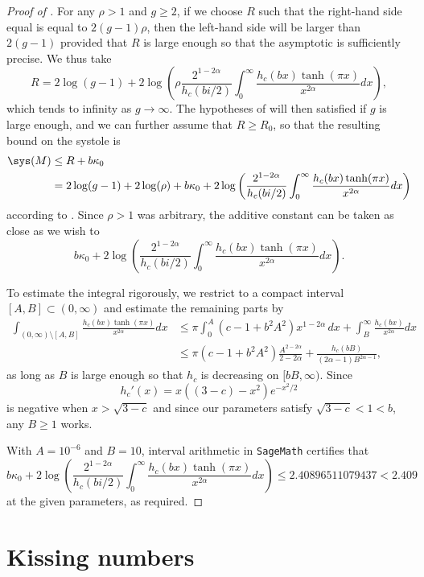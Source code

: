 \documentclass[12pt]{amsart}
\numberwithin{equation}{section}
\begin{document}
\begin{proof}[Proof of ]
For any $\rho>1$ and $g\geq 2$, if we choose $R$ such that the right-hand side equal is equal to $2(g-1)\rho$, then the left-hand side will be larger than $2(g-1)$ provided that $R$ is large enough so that the asymptotic is sufficiently precise. We thus take
\[
R = 2 \log(g-1)+2\log\left( \rho \frac{2 ^{1-2\alpha}}{h_c(bi/2)} \int_0^\infty \frac{h_c(bx) \tanh(\pi x)}{x^{2\alpha}}dx  \right)   ,
\]
which tends to infinity as $g \to \infty$. The hypotheses of  will then  satisfied if $g$ is large enough, and we can further assume that $R \geq R_0$, so that the resulting bound on the systole is
\begin{align*}
\sys(M) &\leq R + b \kappa_0 \\
& = 2 \log(g-1) + 2\log(\rho) +b \kappa_0 + 2 \log \left( \frac{2 ^{1-2\alpha}}{h_c(bi/2)} \int_0^\infty \frac{h_c(bx) \tanh(\pi x)}{x^{2\alpha}}dx  \right)
\end{align*}
according to . Since $\rho>1$ was arbitrary, the additive constant can be taken as close as we wish to 
\[
b \kappa_0 + 2 \log \left( \frac{2 ^{1-2\alpha}}{h_c(bi/2)} \int_0^\infty \frac{h_c(bx) \tanh(\pi x)}{x^{2\alpha}}dx  \right).
\]

To estimate the integral rigorously, we restrict to a compact interval $[A,B] \subset (0,\infty)$ and  estimate the remaining parts by
\begin{align*}
\int_{(0,\infty) \setminus [A,B]} \frac{h_c(bx) \tanh(\pi x)}{x^{2\alpha}}dx &\leq \pi  \int_0^A (c - 1 + b^2 A^2) x^{1-2\alpha} \,dx + \int_B^\infty \frac{h_c(bx)}{x^{2\alpha}} dx \\
& \leq  \pi  (c - 1 + b^2 A^2)\frac{A^{2-2\alpha}}{2-2\alpha}+ \frac{h_c(bB)}{(2\alpha-1)B^{2\alpha-1}},
\end{align*}
as long as $B$ is large enough so that $h_c$ is decreasing on $[bB,\infty)$. Since \[h_c'(x) = x((3-c)- x^2)e^{-x^2/2}\] is negative when $x > \sqrt{3-c}$ and since our parameters satisfy $\sqrt{3-c} < 1 < b$, any $B\geq 1$ works.

With $A = 10^{-6}$ and $B=10$, interval arithmetic in \texttt{SageMath} certifies that
\[
b \kappa_0 + 2 \log \left( \frac{2 ^{1-2\alpha}}{h_c(bi/2)} \int_0^\infty \frac{h_c(bx) \tanh(\pi x)}{x^{2\alpha}}dx  \right) \leq 2.40896511079437 < 2.409
\]
at the given parameters, as required.
\end{proof}

\section{Kissing numbers}
\end{document}
